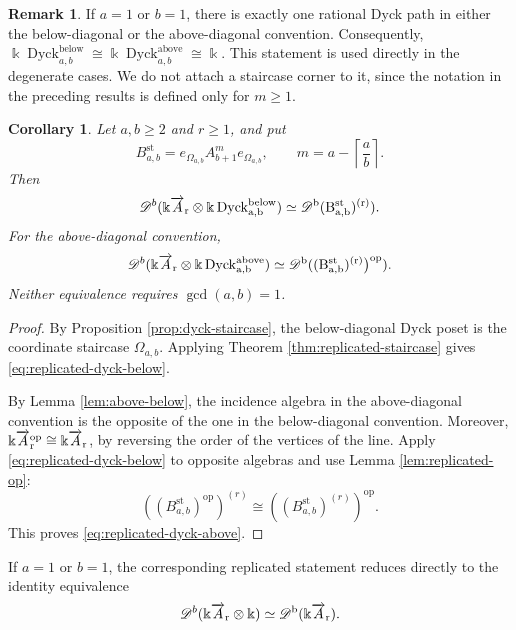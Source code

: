 \documentclass[12pt,a4paper,english,reqno]{amsart}
\theoremstyle{plain}
\newtheorem{corollary}[theorem]{Corollary}
\theoremstyle{definition}
\newtheorem{remark}[theorem]{Remark}
\newcommand{\kk}{\Bbbk}
\newcommand{\Dyck}{\operatorname{Dyck}}
\newcommand{\op}{\mathrm{op}}
\newcommand{\Db}[1]{{\mathscr D}^b(#1)}
\newcommand{\ovr}{\rm \overrightarrow}
\begin{document}
\begin{remark}
\label{rem:degenerate-dyck}
If $a=1$ or $b=1$, there is exactly one rational Dyck path in either
the below-diagonal or the above-diagonal convention.  Consequently, $\kk\Dyck^{\mathrm{below}}_{a,b}
 \cong
 \kk\Dyck^{\mathrm{above}}_{a,b}
 \cong\kk$.
This statement is used directly in the degenerate cases.  We do not attach a
staircase corner to it, since the notation in the preceding results is
defined only for $m\geq1$.
\end{remark}

\begin{corollary}
\label{cor:replicated-rational-dyck}
Let $a,b\geq2$ and $r\geq1$, and put
\[
 B^{\mathrm{st}}_{a,b}
 =
 e_{\Omega_{a,b}}A_{b+1}^{m}e_{\Omega_{a,b}},
 \qquad
 m=a-\left\lceil\frac ab\right\rceil.
\]
Then
\begin{equation}
 \Db{\kk\ovr A_r\otimes
 \kk\Dyck^{\mathrm{below}}_{a,b}}
 \simeq
 \Db{B^{\mathrm{st}}_{a,b})^{(r)}}.
\label{eq:replicated-dyck-below}
\end{equation}
For the above-diagonal convention,
\begin{equation}
 \Db{\kk\ovr A_r\otimes
 \kk\Dyck^{\mathrm{above}}_{a,b}}
 \simeq
 \Db{(B^{\mathrm{st}}_{a,b})^{(r)}\bigr)^{\op}}.
\label{eq:replicated-dyck-above}
\end{equation}
Neither equivalence requires $\gcd(a,b)=1$.
\end{corollary}

\begin{proof}
By Proposition \ref{prop:dyck-staircase}, the below-diagonal Dyck poset is the
coordinate staircase $\Omega_{a,b}$.  Applying
Theorem \ref{thm:replicated-staircase} gives
\eqref{eq:replicated-dyck-below}.

By Lemma \ref{lem:above-below}, the incidence algebra in the
above-diagonal convention is the opposite of the one in the
below-diagonal convention.  Moreover,
$\kk\ovr A_r^{\op}\cong\kk\ovr A_r$, by reversing the order of
the vertices of the line.  Apply
\eqref{eq:replicated-dyck-below} to opposite algebras and use
Lemma \ref{lem:replicated-op}:
\[
 ((B^{\mathrm{st}}_{a,b})^{\op})^{(r)}
 \cong
((B^{\mathrm{st}}_{a,b})^{(r)})^{\op}.
\]
This proves \eqref{eq:replicated-dyck-above}.
\end{proof}

If $a=1$ or $b=1$, the corresponding replicated statement reduces
directly to the identity equivalence
\[
 \Db{\kk\ovr A_r\otimes\kk}
 \simeq
 \Db{\kk\ovr A_r}.
\]
\end{document}
